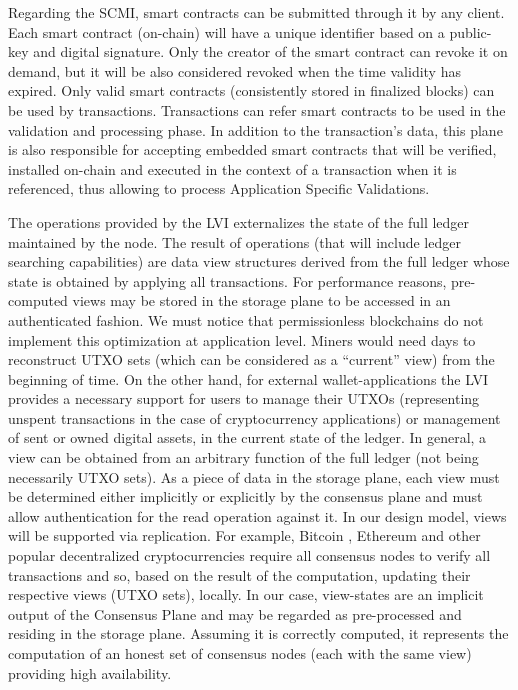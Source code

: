 Regarding the \gls{SCMI}, smart contracts can be submitted through it by any client. Each smart contract (on-chain) will have a unique identifier based on a public-key and digital signature. Only the creator of the smart contract can revoke it on demand, but it will be also considered revoked when the time validity has expired. Only valid smart contracts (consistently stored in finalized blocks) can be used by transactions. Transactions can refer smart contracts to be used in the validation and processing phase. In addition to the transaction's data, this plane is also responsible for accepting embedded smart contracts that will be verified, installed on-chain and executed in the context of a transaction when it is referenced, thus allowing to process Application Specific Validations. 

The operations provided by the \gls{LVI} externalizes the state of the full ledger maintained by the node. The result of operations (that will include ledger searching capabilities) are data view structures derived from the full ledger whose state is obtained by applying all transactions. For performance reasons, pre-computed views may be stored in the storage plane to be accessed in an authenticated fashion. We must notice that permissionless blockchains do not implement this optimization at application level. Miners would need days to reconstruct \gls{UTXO} sets (which can be considered as a “current” view) from the beginning of time. On the other hand, for external wallet-applications the \gls{LVI} provides a necessary support for users to manage their \gls{UTXO}s (representing unspent transactions in the case of cryptocurrency applications) or management of sent or owned digital assets, in the current state of the ledger. In general, a view can be obtained from an arbitrary function of the full ledger (not being necessarily \gls{UTXO} sets). As a piece of data in the storage plane, each view must be determined either implicitly or explicitly by the consensus plane and must allow authentication for the read operation against it. In our design model, views will be supported via replication. For example, Bitcoin \cite{bitcoin}, Ethereum \cite{ethereum} and other popular decentralized cryptocurrencies require all consensus nodes to verify all transactions and so, based on the result of the computation, updating their respective views (\gls{UTXO} sets), locally. In our case, view-states are an implicit output of the Consensus Plane and may be regarded as pre-processed and residing in the storage plane. Assuming it is correctly computed, it represents the computation of an honest set of consensus nodes (each with the same view) providing high availability.


